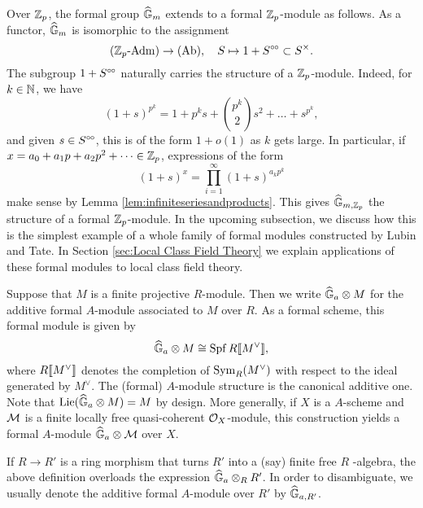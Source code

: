 \documentclass[../main.tex]{subfiles}
\begin{document}
\begin{xpl}

  Over $\mathbb{Z}_p$, the formal group $\widehat{\mathbb{G}}_m$ extends to a formal $\mathbb{Z}_p$-module
  as follows. 
  As a functor, $\widehat{\mathbb{G}}_m$ is isomorphic to the assignment
  \begin{equation*}
    {({\mathbb{Z}_p}\text-\allowbreak\mathrm{Adm})} \to {(\mathrm{Ab})}, \quad S \mapsto 1 + S^{\circ \hspace{-0.5pt} \circ} \subset S^\times.
  \end{equation*}
  The subgroup $1 + S^{\circ \hspace{-0.5pt} \circ}$ naturally carries the structure of a $\mathbb{Z}_p$-module.
  Indeed, for $k \in \mathbb{N}$, we have
  \begin{equation*}
    (1+s)^{p^k} = 1 + p^ks + \binom{p^k}2 s^2 + \dots + s^{p^k},
  \end{equation*}
  and given $s \in S^{\circ \hspace{-0.5pt} \circ}$, this is of the form $1+ o(1)$ as $k$ gets large. 
  In particular, if $x = a_0 + a_1 p + a_2p^2 + \dots \in \mathbb{Z}_p$, expressions of  the form
  \begin{equation*}
    (1+s)^x = \prod_{i = 1}^\infty (1+s)^{a_k p^k}
  \end{equation*}
  make sense by Lemma \ref{lem:infiniteseriesandproducts}. This gives
  $\widehat{\mathbb{G}}_{m,\mathbb{Z}_p}$ the structure of a formal $\mathbb{Z}_p$-module. 
  In the upcoming subsection, we discuss how this is the simplest example of a
  whole family of formal modules constructed by 
  Lubin and Tate. In Section \ref{sec:Local Class Field Theory} we explain
  applications of these formal modules to local class field theory.
\end{xpl}

\begin{defi}
  \label{def:additiveformalmoduleassociatedtomodule}
  Suppose that $M$ is a finite projective $R$-module. Then we write
  $\widehat{\mathbb{G}}_a \otimes M$ for the additive formal $A$-module associated to $M$ over $R$.
  As a formal scheme, this formal module is given by
  \begin{equation*}
    \widehat{\mathbb{G}}_a \otimes M \cong \operatorname{Spf} R \llbracket M^\vee \rrbracket,
  \end{equation*}
  where $R \llbracket M^\vee \rrbracket$ denotes the completion of $\operatorname{Sym}_R(M^\vee)$ with respect
  to the ideal generated by $M^\vee$. The (formal) $A$-module structure is the
  canonical additive one. 
  Note that $\operatorname{Lie}(\widehat{\mathbb{G}}_a \otimes M) = M$ by design. 
  More generally, if $X$ is a  $A$-scheme
  and $\mathcal{M}$ is a finite locally free quasi-coherent 
  $\mathcal{O}_X$-module, this construction yields a formal $A$-module
  $\widehat{\mathbb{G}}_a \otimes \mathcal{M}$ over $X$.
\end{defi}
\begin{rmk} 
  If $R\to R'$ is a ring morphism that turns $R'$ into a (say) finite free
$R$ -algebra, the above definition overloads the expression $\widehat{\mathbb{G}}_a \otimes_R R'$.
  In order to disambiguate, we usually denote the additive formal $A$-module
  over $R'$ by $\widehat{\mathbb{G}}_{a, R'}$. 
\end{rmk}
\end{document}
